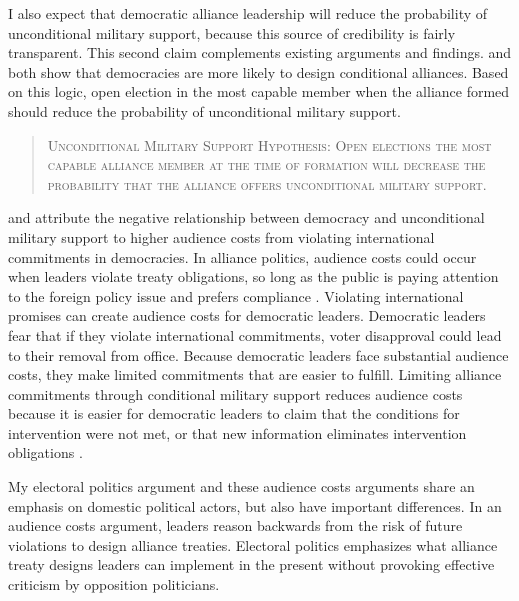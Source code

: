 \documentclass[12pt]{article}
\begin{document}
I also expect that democratic alliance leadership will reduce the probability of unconditional military support, because this source of credibility is fairly transparent. 
This second claim complements existing arguments and findings. 
\citet{Mattes2012} and \citet{Chibaetal2015} both show that democracies are more likely to design conditional alliances. 
Based on this logic, open election in the most capable member when the alliance formed should reduce the probability of unconditional military support.


\begin{quote}
\textsc{Unconditional Military Support Hypothesis: Open elections the most capable alliance member at the time of formation will decrease the probability that the alliance offers unconditional military support.}
\end{quote} 


\citet{Mattes2012} and \citet{Chibaetal2015} attribute the negative relationship between democracy and unconditional military support to higher audience costs from violating international commitments in democracies. 
In alliance politics, audience costs could occur when leaders violate treaty obligations, so long as the public is paying attention to the foreign policy issue \citep{Slantchev2006, PotterBaum2014} and prefers compliance \citep{Chaudoin2014, KertzerBrutger2016}.  
Violating international promises can create audience costs for democratic leaders.
Democratic leaders fear that if they violate international commitments, voter disapproval could lead to their removal from office.  
Because democratic leaders face substantial audience costs, they make limited commitments that are easier to fulfill. 
Limiting alliance commitments through conditional military support reduces audience costs because it is easier for democratic leaders to claim that the conditions for intervention were not met, or that new information eliminates intervention obligations \citep{LevenduskyHorowitz2012}. 


My electoral politics argument and these audience costs arguments share an emphasis on domestic political actors, but also have important differences. 
In an audience costs argument, leaders reason backwards from the risk of future violations to design alliance treaties. 
Electoral politics emphasizes what alliance treaty designs leaders can implement in the present without provoking effective criticism by opposition politicians. 
     
\end{document}
